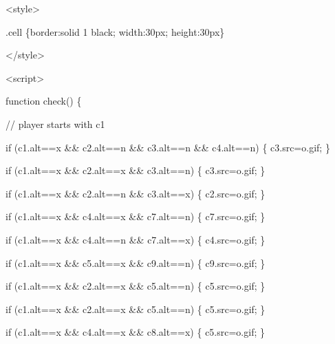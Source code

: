 \documentclass[
]{article}
\begin{document}
\textless style\textgreater{}

.cell \{border:solid 1 black; width:30px; height:30px\}

\textless/style\textgreater{}

\textless script\textgreater{}

function check() \{

// player starts with c1

if (c1.alt==\textquotesingle x\textquotesingle{} \&\&
c2.alt==\textquotesingle n\textquotesingle{} \&\&
c3.alt==\textquotesingle n\textquotesingle{} \&\&
c4.alt==\textquotesingle n\textquotesingle) \{
c3.src=\textquotesingle o.gif\textquotesingle; \}

if (c1.alt==\textquotesingle x\textquotesingle{} \&\&
c2.alt==\textquotesingle x\textquotesingle{} \&\&
c3.alt==\textquotesingle n\textquotesingle) \{
c3.src=\textquotesingle o.gif\textquotesingle; \}

if (c1.alt==\textquotesingle x\textquotesingle{} \&\&
c2.alt==\textquotesingle n\textquotesingle{} \&\&
c3.alt==\textquotesingle x\textquotesingle) \{
c2.src=\textquotesingle o.gif\textquotesingle; \}

if (c1.alt==\textquotesingle x\textquotesingle{} \&\&
c4.alt==\textquotesingle x\textquotesingle{} \&\&
c7.alt==\textquotesingle n\textquotesingle) \{
c7.src=\textquotesingle o.gif\textquotesingle; \}

if (c1.alt==\textquotesingle x\textquotesingle{} \&\&
c4.alt==\textquotesingle n\textquotesingle{} \&\&
c7.alt==\textquotesingle x\textquotesingle) \{
c4.src=\textquotesingle o.gif\textquotesingle; \}

if (c1.alt==\textquotesingle x\textquotesingle{} \&\&
c5.alt==\textquotesingle x\textquotesingle{} \&\&
c9.alt==\textquotesingle n\textquotesingle) \{
c9.src=\textquotesingle o.gif\textquotesingle; \}

if (c1.alt==\textquotesingle x\textquotesingle{} \&\&
c2.alt==\textquotesingle x\textquotesingle{} \&\&
c5.alt==\textquotesingle n\textquotesingle) \{
c5.src=\textquotesingle o.gif\textquotesingle; \}

if (c1.alt==\textquotesingle x\textquotesingle{} \&\&
c2.alt==\textquotesingle x\textquotesingle{} \&\&
c5.alt==\textquotesingle n\textquotesingle) \{
c5.src=\textquotesingle o.gif\textquotesingle; \}

if (c1.alt==\textquotesingle x\textquotesingle{} \&\&
c4.alt==\textquotesingle x\textquotesingle{} \&\&
c8.alt==\textquotesingle x\textquotesingle) \{
c5.src=\textquotesingle o.gif\textquotesingle; \}
\end{document}
